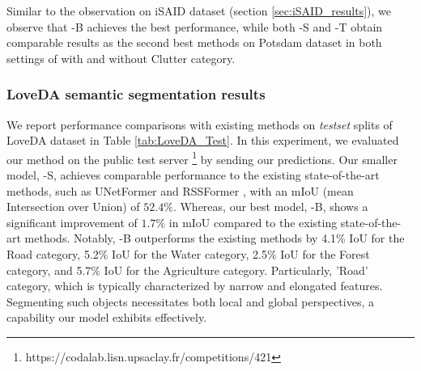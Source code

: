\documentclass[journal]{IEEEtran}
\begin{document}
Similar to the observation on iSAID dataset (section \ref{sec:iSAID_results}), we observe that \model-B achieves the best performance, while both \model-S and \model-T obtain comparable results as the second best methods on Potsdam dataset in both settings of with and without Clutter category.  


\subsubsection{\textbf{LoveDA semantic segmentation results}} We report performance comparisons with existing methods on \textit{testset} splits of LoveDA dataset in Table \ref{tab:LoveDA_Test}.
In this experiment, we evaluated our method on the public test server \footnote{https://codalab.lisn.upsaclay.fr/competitions/421} by sending our predictions.  Our smaller model, \model-S, achieves comparable performance to the existing state-of-the-art methods, such as UNetFormer \cite{wang2022unetformer} and RSSFormer \cite{xu2023rssformer}, with an mIoU (mean Intersection over Union) of $52.4\%$. Whereas, our best model, \model-B, shows a significant improvement of $1.7\%$ in mIoU compared to the existing state-of-the-art methods. Notably, \model-B outperforms the existing methods by 4.1\% IoU for the Road category, 5.2\% IoU for the Water category, 2.5\% IoU for the Forest category, and 5.7\% IoU for the Agriculture category. Particularly, 'Road' category, which is typically characterized by narrow and elongated features. Segmenting such objects necessitates both local and global perspectives, a capability our model exhibits effectively.
\end{document}
